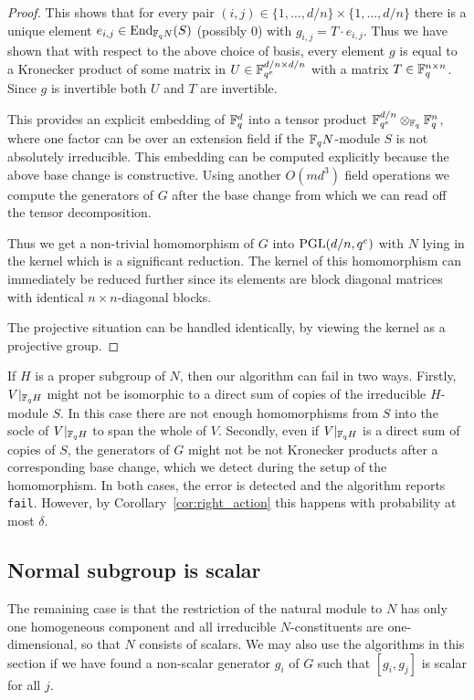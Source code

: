 \begin{proof}
This shows that for every pair $(i,j) \in \{ 1, \ldots, d/n \} \times 
\{ 1, \ldots, d/n \}$ there
is a unique element $e_{i,j} \in \End_{\F_q N}(S)$ (possibly $0$) with 
$g_{i,j} = T \cdot e_{i,j}$. Thus we have shown that with respect to
the above choice of basis, every element $g$ is equal to a Kronecker 
product of some matrix in $U \in \mathbb{F}_{q^e}^{d/n \times d/n}$ with a matrix
$T \in \mathbb{F}_q^{n \times n}$. Since $g$ is invertible both 
$U$ and $T$ are invertible. 

This provides an explicit embedding of 
$\mathbb{F}_q^d$ into a tensor product $\mathbb{F}_{q^e}^{d/n} \otimes_{\mathbb{F}_q} \mathbb{F}_q^n$, 
where one factor can be over an extension field if the $\mathbb{F}_q N$-module
$S$ is not absolutely irreducible. This embedding can be computed
explicitly because the above base change is constructive.
Using another $O(md^3)$ field operations we compute the generators
of $G$ after the base change from which we can read off the tensor
decomposition.

Thus we get a non-trivial homomorphism of $G$ into $\PGL(d/n,q^e)$ with
$N$ lying in the kernel which is a significant reduction. The kernel of
this homomorphism can immediately be reduced further since its 
elements are block
diagonal matrices with identical $n \times n$-diagonal blocks.

The projective situation can be handled identically,
by viewing the kernel as a  projective group.
\end{proof}

If  $H$ is a proper subgroup of $N$, then
our algorithm can fail in two ways. Firstly,
$V|_{\mathbb{F}_q H}$ might not be isomorphic to a direct sum of
copies of the irreducible $H$-module $S$. In this case
there are not enough homomorphisms from $S$ into
the socle of $V|_{\mathbb{F}_q H}$ to span the whole of $V$. Secondly,
even if $V|_{\mathbb{F}_q H}$ is a direct sum of copies of $S$,  the
generators of $G$ might not be not Kronecker products after a corresponding
base change, which we detect during the setup of the homomorphism. In
both cases, the error is detected and the algorithm reports {\tt fail}. However,
by Corollary~\ref{cor:right_action} this happens with probability at most $\delta$.

\subsection{Normal subgroup is scalar} \label{subsec:scalars}

The remaining case is that the restriction of the natural module to $N$
has only one homogeneous component and all irreducible $N$-constituents
are one-dimensional, so that $N$ consists of scalars.  
We may also use the algorithms in this section if we have found a 
non-scalar generator $g_i$ of $G$ such that $[g_i, g_j]$ is scalar for all $j$. 



